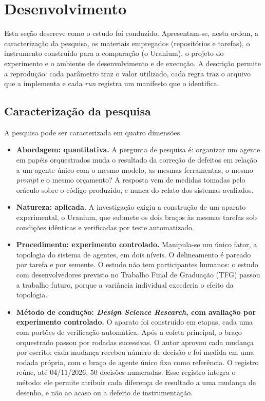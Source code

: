 \section{Desenvolvimento}
\label{desenvolvimento}

Esta seção descreve como o estudo foi conduzido. Apresentam-se, nesta ordem, a caracterização da pesquisa, os materiais empregados (repositórios e tarefas), o instrumento construído para a comparação (o Uranium), o projeto do experimento e o ambiente de desenvolvimento e de execução. A descrição permite a reprodução: cada parâmetro traz o valor utilizado, cada regra traz o arquivo que a implementa e cada \textit{run} registra um manifesto que o identifica.

\subsection{Caracterização da pesquisa}
\label{ssec:caracterizacao}

A pesquisa pode ser caracterizada em quatro dimensões.

\begin{itemize}
    \item \textbf{Abordagem: quantitativa.} A pergunta de pesquisa é: organizar um agente em papéis orquestrados muda o resultado da correção de defeitos em relação a um agente único com o mesmo modelo, as mesmas ferramentas, o mesmo \textit{prompt} e o mesmo orçamento? A resposta vem de medidas tomadas pelo oráculo sobre o código produzido, e nunca do relato dos sistemas avaliados.
    \item \textbf{Natureza: aplicada.} A investigação exigiu a construção de um aparato experimental, o Uranium, que submete os dois braços às mesmas tarefas sob condições idênticas e verificadas por teste automatizado.
    \item \textbf{Procedimento: experimento controlado.} Manipula-se um único fator, a topologia do sistema de agentes, em dois níveis. O delineamento é pareado por tarefa e por semente. O estudo não tem participantes humanos: o estudo com desenvolvedores previsto no Trabalho Final de Graduação (TFG) passou a trabalho futuro, porque a variância individual excederia o efeito da topologia.
    \item \textbf{Método de condução: \textit{Design Science Research}, com avaliação por experimento controlado.} O aparato foi construído em etapas, cada uma com portões de verificação automática. Após a coleta principal, o braço orquestrado passou por rodadas sucessivas. O autor aprovou cada mudança por escrito; cada mudança recebeu número de decisão e foi medida em uma rodada própria, com o braço de agente único fixo como referência. O registro reúne, até 04/11/2026, 50 decisões numeradas. Esse registro integra o método: ele permite atribuir cada diferença de resultado a uma mudança de desenho, e não ao acaso ou a defeito de instrumentação.
\end{itemize}

